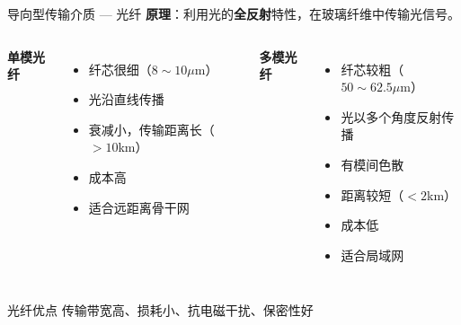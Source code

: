 \documentclass[10pt, aspectratio=169]{beamer}
\begin{document}
\begin{frame}{导向型传输介质 --- 光纤}
    \textbf{原理}：利用光的\textbf{全反射}特性，在玻璃纤维中传输光信号。
    \vspace{0.5em}
    \begin{columns}[T]
        \textbf{单模光纤}
        \begin{itemize}
            \item 纤芯很细（$8\sim10\mu$m）
            \item 光沿直线传播
            \item 衰减小，传输距离长（$>10$km）
            \item 成本高
            \item 适合远距离骨干网
        \end{itemize}
        \textbf{多模光纤}
        \begin{itemize}
            \item 纤芯较粗（$50\sim62.5\mu$m）
            \item 光以多个角度反射传播
            \item 有模间色散
            \item 距离较短（$<2$km）
            \item 成本低
            \item 适合局域网
        \end{itemize}
    \end{columns}
    \vspace{0.3em}
    \begin{block}{光纤优点}
        传输带宽高、损耗小、抗电磁干扰、保密性好
    \end{block}
\end{frame}
\end{document}
